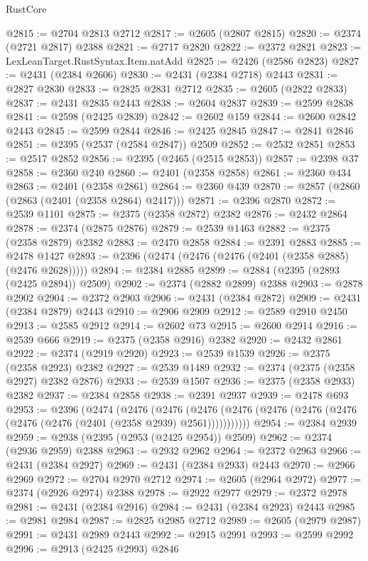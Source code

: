 \begin{lexlean}{RustCore}
\begin{coremodule}
@2815 := @2704 @2813 @2712
@2817 := @2605 (@2807 @2815)
@2820 := @2374 (@2721 @2817) @2388
@2821 := @2717 @2820
@2822 := @2372 @2821
@2823 := LexLeanTarget.RustSyntax.Item.natAdd
@2825 := @2426 (@2586 @2823)
@2827 := @2431 (@2384 @2606)
@2830 := @2431 (@2384 @2718) @2443
@2831 := @2827 @2830
@2833 := @2825 @2831 @2712
@2835 := @2605 (@2822 @2833)
@2837 := @2431 @2835 @2443
@2838 := @2604 @2837
@2839 := @2599 @2838
@2841 := @2598 (@2425 @2839)
@2842 := @2602 @159
@2844 := @2600 @2842 @2443
@2845 := @2599 @2844
@2846 := @2425 @2845
@2847 := @2841 @2846
@2851 := @2395 (@2537 (@2584 @2847)) @2509
@2852 := @2532 @2851
@2853 := @2517 @2852
@2856 := @2395 (@2465 (@2515 @2853))
@2857 := @2398 @37
@2858 := @2360 @240
@2860 := @2401 (@2358 @2858)
@2861 := @2360 @434
@2863 := @2401 (@2358 @2861)
@2864 := @2360 @439
@2870 := @2857 (@2860 (@2863 (@2401 (@2358 @2864) @2417)))
@2871 := @2396 @2870
@2872 := @2539 @1101
@2875 := @2375 (@2358 @2872) @2382
@2876 := @2432 @2864
@2878 := @2374 (@2875 @2876)
@2879 := @2539 @1463
@2882 := @2375 (@2358 @2879) @2382
@2883 := @2470 @2858
@2884 := @2391 @2883
@2885 := @2478 @1427
@2893 := @2396 (@2474 (@2476 (@2476 (@2401 (@2358 @2885) (@2476 @2628)))))
@2894 := @2384 @2885
@2899 := @2884 (@2395 (@2893 (@2425 @2894)) @2509)
@2902 := @2374 (@2882 @2899) @2388
@2903 := @2878 @2902
@2904 := @2372 @2903
@2906 := @2431 (@2384 @2872)
@2909 := @2431 (@2384 @2879) @2443
@2910 := @2906 @2909
@2912 := @2589 @2910 @2450
@2913 := @2585 @2912
@2914 := @2602 @73
@2915 := @2600 @2914
@2916 := @2539 @666
@2919 := @2375 (@2358 @2916) @2382
@2920 := @2432 @2861
@2922 := @2374 (@2919 @2920)
@2923 := @2539 @1539
@2926 := @2375 (@2358 @2923) @2382
@2927 := @2539 @1489
@2932 := @2374 (@2375 (@2358 @2927) @2382 @2876)
@2933 := @2539 @1507
@2936 := @2375 (@2358 @2933) @2382
@2937 := @2384 @2858
@2938 := @2391 @2937
@2939 := @2478 @693
@2953 := @2396
    (@2474
      (@2476
        (@2476
          (@2476 (@2476 (@2476 (@2476 (@2476 (@2476 (@2476 (@2401 (@2358 @2939) @2561)))))))))))
@2954 := @2384 @2939
@2959 := @2938 (@2395 (@2953 (@2425 @2954)) @2509)
@2962 := @2374 (@2936 @2959) @2388
@2963 := @2932 @2962
@2964 := @2372 @2963
@2966 := @2431 (@2384 @2927)
@2969 := @2431 (@2384 @2933) @2443
@2970 := @2966 @2969
@2972 := @2704 @2970 @2712
@2974 := @2605 (@2964 @2972)
@2977 := @2374 (@2926 @2974) @2388
@2978 := @2922 @2977
@2979 := @2372 @2978
@2981 := @2431 (@2384 @2916)
@2984 := @2431 (@2384 @2923) @2443
@2985 := @2981 @2984
@2987 := @2825 @2985 @2712
@2989 := @2605 (@2979 @2987)
@2991 := @2431 @2989 @2443
@2992 := @2915 @2991
@2993 := @2599 @2992
@2996 := @2913 (@2425 @2993) @2846

\end{coremodule}
\end{lexlean}
